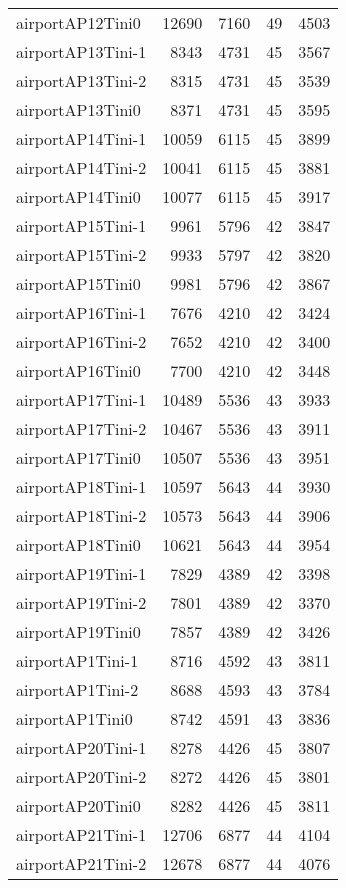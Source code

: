 \begin{longtable}{lrrrr}
airportAP12Tini0 & 12690 & 7160 & 49 & 4503 \\
airportAP13Tini-1 & 8343 & 4731 & 45 & 3567 \\
airportAP13Tini-2 & 8315 & 4731 & 45 & 3539 \\
airportAP13Tini0 & 8371 & 4731 & 45 & 3595 \\
airportAP14Tini-1 & 10059 & 6115 & 45 & 3899 \\
airportAP14Tini-2 & 10041 & 6115 & 45 & 3881 \\
airportAP14Tini0 & 10077 & 6115 & 45 & 3917 \\
airportAP15Tini-1 & 9961 & 5796 & 42 & 3847 \\
airportAP15Tini-2 & 9933 & 5797 & 42 & 3820 \\
airportAP15Tini0 & 9981 & 5796 & 42 & 3867 \\
airportAP16Tini-1 & 7676 & 4210 & 42 & 3424 \\
airportAP16Tini-2 & 7652 & 4210 & 42 & 3400 \\
airportAP16Tini0 & 7700 & 4210 & 42 & 3448 \\
airportAP17Tini-1 & 10489 & 5536 & 43 & 3933 \\
airportAP17Tini-2 & 10467 & 5536 & 43 & 3911 \\
airportAP17Tini0 & 10507 & 5536 & 43 & 3951 \\
airportAP18Tini-1 & 10597 & 5643 & 44 & 3930 \\
airportAP18Tini-2 & 10573 & 5643 & 44 & 3906 \\
airportAP18Tini0 & 10621 & 5643 & 44 & 3954 \\
airportAP19Tini-1 & 7829 & 4389 & 42 & 3398 \\
airportAP19Tini-2 & 7801 & 4389 & 42 & 3370 \\
airportAP19Tini0 & 7857 & 4389 & 42 & 3426 \\
airportAP1Tini-1 & 8716 & 4592 & 43 & 3811 \\
airportAP1Tini-2 & 8688 & 4593 & 43 & 3784 \\
airportAP1Tini0 & 8742 & 4591 & 43 & 3836 \\
airportAP20Tini-1 & 8278 & 4426 & 45 & 3807 \\
airportAP20Tini-2 & 8272 & 4426 & 45 & 3801 \\
airportAP20Tini0 & 8282 & 4426 & 45 & 3811 \\
airportAP21Tini-1 & 12706 & 6877 & 44 & 4104 \\
airportAP21Tini-2 & 12678 & 6877 & 44 & 4076 \\

\end{longtable}

